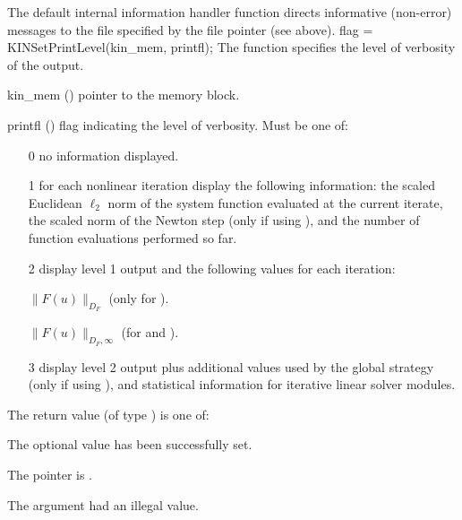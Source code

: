 {
  The default internal information handler function directs informative (non-error)
  messages to the file specified by the file pointer  (see
   above).
}
{
flag = KINSetPrintLevel(kin\_mem, printfl);
}
{
  The function  specifies the level of verbosity
  of the output.
}
{
  \begin{args}

  \item[kin\_mem] ()
    pointer to the {\kinsol} memory block.

  \item[printfl] ()
    flag indicating the level of verbosity. Must be one of:

    \begin{itemize}
    \item[0]
      no information displayed.

    \item[1]
      for each nonlinear iteration display
      the following information: the scaled
      Euclidean $\ell_2$ norm of the system function
      evaluated at the current iterate, the
      scaled norm of the Newton step (only if
      using ), and the
      number of function evaluations performed
      so far.

    \item[2]
      display level 1 output and the
      following values for each iteration:

      $\|F(u)\|_{D_F}$
      (only for ).

      $\|F(u)\|_{D_F,\infty}$
      (for  and
      ).

    \item[3]
      display level 2 output plus additional
      values used by the global strategy
      (only if using ), and
      statistical information for iterative linear
      solver modules.
    \end{itemize}

  \end{args}
}
{
  The return value  (of type ) is one of:
  \begin{args}
  \item[\Id{KIN\_SUCCESS}]
    The optional value has been successfully set.
  \item[\Id{KIN\_MEM\_NULL}]
    The  pointer is .
  \item[\Id{KIN\_ILL\_INPUT}]
    The argument  had an illegal value.
  \end{args}
}
